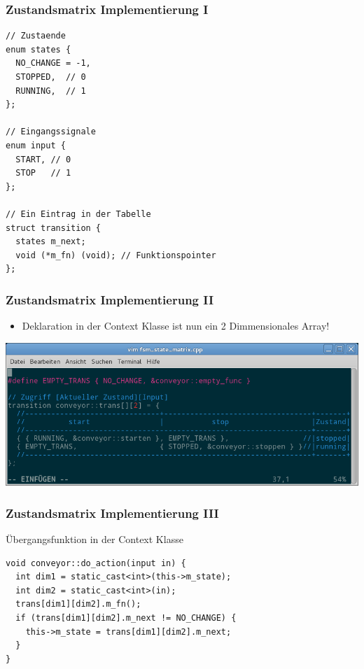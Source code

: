 \documentclass{beamer}
\begin{document}
\begin{frame}[fragile]
 \frametitle{Zustandsmatrix Implementierung I}
 \begin{lstlisting}
// Zustaende
enum states {
  NO_CHANGE = -1,
  STOPPED,  // 0
  RUNNING,  // 1
};

// Eingangssignale
enum input {
  START, // 0
  STOP   // 1
};

// Ein Eintrag in der Tabelle
struct transition {
  states m_next;
  void (*m_fn) (void); // Funktionspointer
};
 \end{lstlisting}
\end{frame}

\begin{frame}
 \frametitle{Zustandsmatrix Implementierung II}
 \begin{itemize}
  \item Deklaration in der Context Klasse ist nun ein 2 Dimmensionales Array!
 \end{itemize}
 \includegraphics[scale=.4]{img/matrix_vim.png}
\end{frame}

\begin{frame}[fragile]
 \frametitle{Zustandsmatrix Implementierung III}
 \"Ubergangsfunktion in der Context Klasse
 \begin{lstlisting}
void conveyor::do_action(input in) {
  int dim1 = static_cast<int>(this->m_state);
  int dim2 = static_cast<int>(in);
  trans[dim1][dim2].m_fn();
  if (trans[dim1][dim2].m_next != NO_CHANGE) {
    this->m_state = trans[dim1][dim2].m_next;
  }
}
 \end{lstlisting}
\end{frame}
\end{document}
